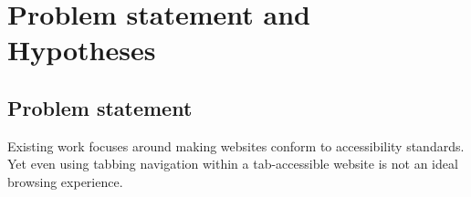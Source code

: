 \documentclass[a4paper, 12pt]{report}
\begin{document}
\section{Problem statement and Hypotheses}
\subsection{Problem statement}
Existing work focuses around making websites conform to accessibility standards. Yet even using tabbing navigation within a tab-accessible website is not an ideal browsing experience.
\end{document}
